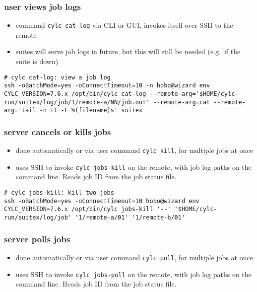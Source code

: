 \subsubsection{user views job logs}

\begin{itemize}
  \item command \lstinline=cylc cat-log= via CLI or GUI, invokes itself over
    SSH to the remote
  \item suites will serve job logs in future, but this will still be needed
    (e.g.\ if the suite is down)
\end{itemize}

\vspace{5mm}
\begin{lstlisting}
# cylc cat-log: view a job log
ssh -oBatchMode=yes -oConnectTimeout=10 -n hobo@wizard env CYLC_VERSION=7.6.x /opt/bin/cylc cat-log --remote-arg='$HOME/cylc-run/suitex/log/job/1/remote-a/NN/job.out' --remote-arg=cat --remote-arg='tail -n +1 -F %(filename)s' suitex
\end{lstlisting}


\subsubsection{server cancels or kills jobs}

\begin{itemize}
  \item done automatically or via user command \lstinline=cylc kill=, for
    multiple jobs at once
  \item uses SSH to invoke \lstinline=cylc jobs-kill= on the
    remote, with job log paths on the command line. Reads job ID from the
    job status file.
\end{itemize}

\vspace{5mm}
    \begin{lstlisting}
# cylc jobs-kill: kill two jobs
ssh -oBatchMode=yes -oConnectTimeout=10 hobo@wizard env CYLC_VERSION=7.6.x /opt/bin/cylc jobs-kill '--' '$HOME/cylc-run/suitex/log/job' '1/remote-a/01' '1/remote-b/01'
    \end{lstlisting}

\subsubsection{server polls jobs}

\begin{itemize}
  \item done automatically or via user command \lstinline=cylc poll=, for
    multiple jobs at once
  \item uses SSH to invoke \lstinline=cylc jobs-poll= on the
    remote, with job log paths on the command line. Reads job ID from the
    job status file.
\end{itemize}

